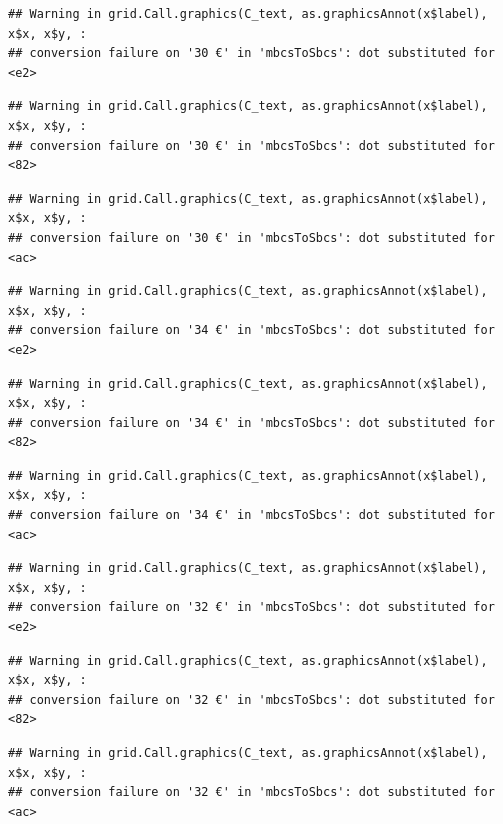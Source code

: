 \documentclass[
]{article}
\begin{document}
\begin{verbatim}
## Warning in grid.Call.graphics(C_text, as.graphicsAnnot(x$label), x$x, x$y, :
## conversion failure on '30 €' in 'mbcsToSbcs': dot substituted for <e2>
\end{verbatim}

\begin{verbatim}
## Warning in grid.Call.graphics(C_text, as.graphicsAnnot(x$label), x$x, x$y, :
## conversion failure on '30 €' in 'mbcsToSbcs': dot substituted for <82>
\end{verbatim}

\begin{verbatim}
## Warning in grid.Call.graphics(C_text, as.graphicsAnnot(x$label), x$x, x$y, :
## conversion failure on '30 €' in 'mbcsToSbcs': dot substituted for <ac>
\end{verbatim}

\begin{verbatim}
## Warning in grid.Call.graphics(C_text, as.graphicsAnnot(x$label), x$x, x$y, :
## conversion failure on '34 €' in 'mbcsToSbcs': dot substituted for <e2>
\end{verbatim}

\begin{verbatim}
## Warning in grid.Call.graphics(C_text, as.graphicsAnnot(x$label), x$x, x$y, :
## conversion failure on '34 €' in 'mbcsToSbcs': dot substituted for <82>
\end{verbatim}

\begin{verbatim}
## Warning in grid.Call.graphics(C_text, as.graphicsAnnot(x$label), x$x, x$y, :
## conversion failure on '34 €' in 'mbcsToSbcs': dot substituted for <ac>
\end{verbatim}

\begin{verbatim}
## Warning in grid.Call.graphics(C_text, as.graphicsAnnot(x$label), x$x, x$y, :
## conversion failure on '32 €' in 'mbcsToSbcs': dot substituted for <e2>
\end{verbatim}

\begin{verbatim}
## Warning in grid.Call.graphics(C_text, as.graphicsAnnot(x$label), x$x, x$y, :
## conversion failure on '32 €' in 'mbcsToSbcs': dot substituted for <82>
\end{verbatim}

\begin{verbatim}
## Warning in grid.Call.graphics(C_text, as.graphicsAnnot(x$label), x$x, x$y, :
## conversion failure on '32 €' in 'mbcsToSbcs': dot substituted for <ac>
\end{verbatim}
\end{document}
